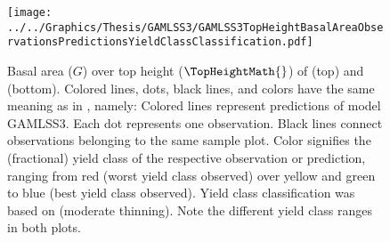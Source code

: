 \begin{figure}[h]
  \centering
  \texttt{[image: ../../Graphics/Thesis/GAMLSS3/GAMLSS3TopHeightBasalAreaObservationsPredictionsYieldClassClassification.pdf]}
  \caption{Basal area (\(G\)) over top height (\(\TopHeightMath{}\)) of \Beech{} (top) and \Spruce{} (bottom).  Colored lines, dots, black lines, and colors have the same meaning as in , namely:  Colored lines represent predictions of model GAMLSS3.  Each dot represents one observation.  Black lines connect observations belonging to the same sample plot.  Color signifies the (fractional) yield class of the respective observation or prediction, ranging from red (worst yield class observed) over yellow and green to blue (best yield class observed). Yield class classification was based on \textcite{Schober1995} (moderate thinning).  Note the different yield class ranges in both plots.}
  \label{fig:GAMLSS3TopHeightBasalAreaObservationsPredictionsYieldClassClassification}
\end{figure}

\clearpage{}

